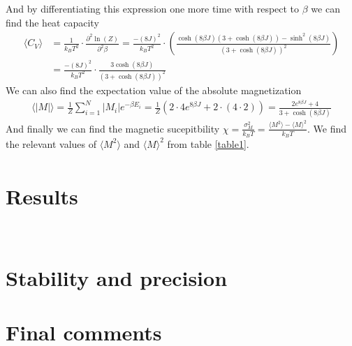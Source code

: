 \documentclass[a4paper,english, 10pt, twoside]{article}
\begin{document}
And by differentiating this expression one more time with respect to $\beta$ we can find the heat capacity
\begin{align*}
 \langle C_V\rangle&= \frac{1}{k_BT^2}\cdot\frac{\partial^2 \ln\left(Z\right)}{\partial^2 \beta} = \frac{-(8J)^2}{k_BT^2}\cdot
 \left(\frac{\cosh(8\beta J)(3+\cosh(8\beta J)) - \sinh^2(8\beta J)}{(3+\cosh(8\beta J))^2}\right)\\
 &= \frac{-(8J)^2}{k_BT^2}\cdot\frac{3\cosh(8\beta J)}{(3+\cosh(8\beta J))^2}
\end{align*}
We can also find the expectation value of the absolute magnetization
\begin{align*}
 \langle |M|\rangle = \frac{1}{Z}\sum\limits_{i=1}^N |M_i|e^{-\beta E_i} = \frac{1}{Z}\left(2\cdot4e^{8\beta J} + 2\cdot (4\cdot 2)\right)
  = \frac{2e^{8\beta J} + 4}{3+\cosh(8\beta J)}
\end{align*}
And finally we can find the magnetic sucepitbility $\chi = \frac{\sigma_M^2}{k_BT} = \frac{\langle M^2\rangle -
\langle M \rangle^2}{k_BT}$. We find the relevant values of $\langle M^2\rangle$ and $\langle M \rangle^2$ from table \ref{table1}.
\begin{align*}
 
\end{align*}

\section*{Results}
\

\section*{Stability and precision}
\section*{Final comments}
\end{document}
